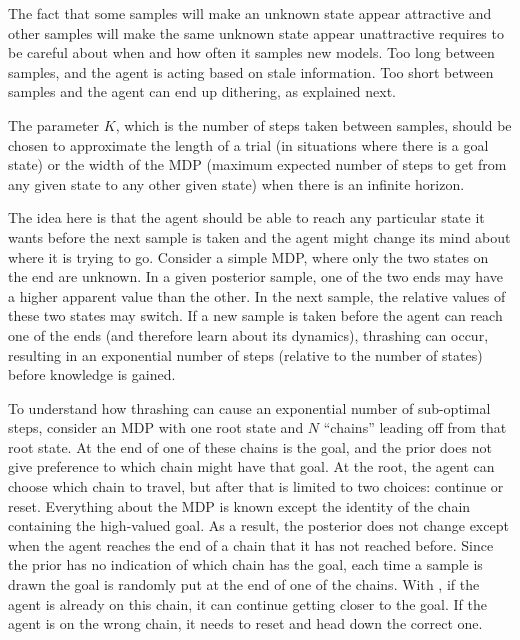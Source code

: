 The fact that some samples will make an unknown state appear attractive and other samples will make the same unknown state appear unattractive requires  to be careful about when and how often it samples new models. Too long between samples, and the agent is acting based on stale information.  Too short between samples and the agent can end up dithering, as explained next.

The parameter $K$, which is the number of steps taken between samples, should be chosen to approximate the length of a trial (in situations where there is a goal state) or the width of the MDP (maximum expected number of steps to get from any given state to any other given state) when there is an infinite horizon.

The idea here is that the agent should be able to reach any particular state it wants before the next sample is taken and the agent might change its mind about where it is trying to go. Consider a simple  MDP, where only the two states on the end are unknown. In a given posterior sample, one of the two ends may have a higher apparent value than the other. In the next sample, the relative values of these two states may switch. If a new sample is taken before the agent can reach one of the ends (and therefore learn about its dynamics), thrashing can occur, resulting in an exponential number of steps (relative to the number of states) before knowledge is gained.

To understand how thrashing can cause an exponential number of sub-optimal steps, consider an MDP with one root state and $N$ ``chains'' leading off from that root state. At the end of one of these chains is the goal, and the prior does not give preference to which chain might have that goal. At the root, the agent can choose which chain to travel, but after that is limited to two choices: continue or reset. Everything about the MDP is known except the identity of the chain containing the high-valued goal. As a result, the posterior does not change except when the agent reaches the end of a chain that it has not reached before. Since the prior has no indication of which chain has the goal, each time a sample is drawn the goal is randomly put at the end of one of the chains. With , if the agent is already on this chain, it can continue getting closer to the goal. If the agent is on the wrong chain, it needs to reset and head down the correct one. 

